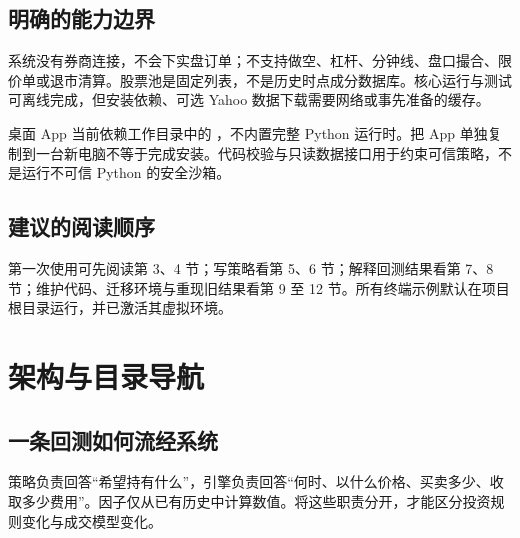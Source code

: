 \documentclass[UTF8,fontset=none,11pt]{ctexart}
\let\originalsection\section
\renewcommand{\section}{\Needspace{9\baselineskip}\originalsection}
\let\originalsubsection\subsection
\renewcommand{\subsection}{\Needspace{8\baselineskip}\originalsubsection}
\begin{document}
\subsection{明确的能力边界}
系统没有券商连接，不会下实盘订单；不支持做空、杠杆、分钟线、盘口撮合、限价单或退市清算。股票池是固定列表，不是历史时点成分数据库。核心运行与测试可离线完成，但安装依赖、可选 Yahoo 数据下载需要网络或事先准备的缓存。

桌面 App 当前依赖工作目录中的 ，不内置完整 Python 运行时。把 App 单独复制到一台新电脑不等于完成安装。代码校验与只读数据接口用于约束可信策略，不是运行不可信 Python 的安全沙箱。

\subsection{建议的阅读顺序}
第一次使用可先阅读第 3、4 节；写策略看第 5、6 节；解释回测结果看第 7、8 节；维护代码、迁移环境与重现旧结果看第 9 至 12 节。所有终端示例默认在项目根目录运行，并已激活其虚拟环境。

\section{架构与目录导航}
\subsection{一条回测如何流经系统}
\begin{center}
\end{center}

策略负责回答“希望持有什么”，引擎负责回答“何时、以什么价格、买卖多少、收取多少费用”。因子仅从已有历史中计算数值。将这些职责分开，才能区分投资规则变化与成交模型变化。
\end{document}
